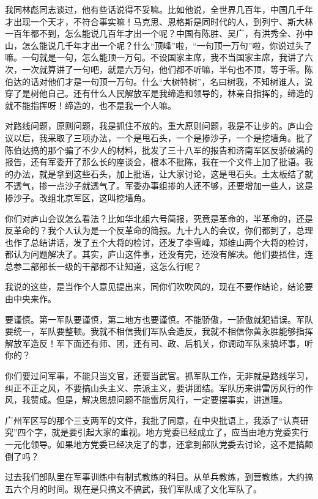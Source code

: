 我同林彪同志谈过，他有些话说得不妥嘛。比如他说，全世界几百年，中国几千年才出现一个天才，不符合事实嘛！马克思、恩格斯是同时代的人，到列宁、斯大林一百年都不到，怎么能说几百年才出一个呢？中国有陈胜、吴广，有洪秀全、孙中山，怎么能说几千年才出一个呢？什么“顶峰”啦，“一句顶一万句”啦，你说过头了嘛。一句就是一句，怎么能顶一万句。不设国家主席，我不当国家主席，我讲了六次，一次就算讲了一句吧，就是六万句，他们都不听嘛，半句也不顶，等于零。陈伯达的话对他们才是一句顶一万句。什么“大树特树”，名曰树我，不知树谁人，说穿了是树他自己。还有什么人民解放军是我缔造和领导的，林亲自指挥的，缔造的就不能指挥呀！缔造的，也不是我一个人嘛。

对路线问题，原则问题，我是抓住不放的。重大原则问题，我是不让步的。庐山会议以后，我采取了三项办法，一个是甩石头，一个是掺沙子，一个是挖墙角。批了陈伯达搞的那个骗了不少人的材料，批发了三十八军的报告和济南军区反骄破满的报告，还有军委开了那么长的座谈会，根本不批陈，我在一个文件上加了批语。我的办法，就是拿到这些石头，加上批语，让大家讨论，这是甩石头。土太板结了就不透气，掺一点沙子就透气了。军委办事组掺的人还不够，还要增加一些人，这是掺沙子。改组北京军区，这叫挖墙角。

你们对庐山会议怎么看法？比如华北组六号简报，究竟是革命的，半革命的，还是反革命的？我个人认为是一个反革命的简报。九十九人的会议，你们都到了，总理也作了总结讲话，发了五个大将的检讨，还发了李雪峰，郑维山两个大将的检讨，都认为问题解决了。其实，庐山这件事，还没有完，还没有解决。他们要捂住，连总参二部部长一级的干部都不让知道，这怎么行呢？

我说的这些，是当作个人意见提出来，同你们吹吹风的，现在不要作结论，结论要由中央来作。

要谨慎。第一军队要谨慎，第二地方也要谨慎。不能骄傲，一骄傲就犯错误。军队要统一，军队要整顿。我就不相信我们军队会造反，我就不相信你黄永胜能够指挥解放军造反！军下面还有师、团，还有司、政、后机关，你调动军队来搞坏事，听你的？

你们要过问军事，不能只当文官，还要当武官。抓军队工作，无非就是路线学习，纠正不正之风，不要搞山头主义、宗派主义，要讲团结。军队历来讲雷厉风行的作风，我赞成。但是，解决思想问题不能雷厉风行，一定要摆事实，讲道理。

广州军区写的那个三支两军的文件，我批了同意，在中央批语上，我添了“认真研究”四个字，就是要引起大家的重视。地方党委已经成立了，应当由地方党委实行一元化领导。如果地方党委已经决定了的事，还拿到部队党委去讨论，这不是搞颠倒了吗？

过去我们部队里在军事训练中有制式教练的科目。从单兵教练，到营教练，大约搞五六个月的时间。现在是只搞文不搞武，我们军队成了文化军队了。

